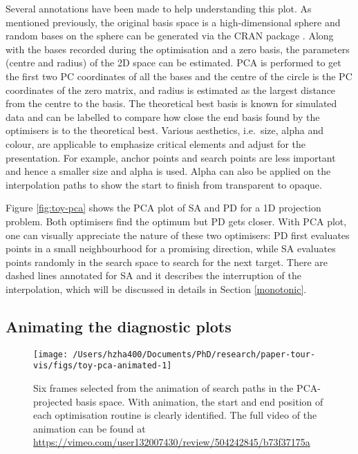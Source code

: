 Several annotations have been made to help understanding this plot. As
mentioned previously, the original basis space is a high-dimensional
sphere and random bases on the sphere can be generated via the CRAN
package  \citep{geozoo}. Along with the bases recorded
during the optimisation and a zero basis, the parameters (centre and
radius) of the 2D space can be estimated. PCA is performed to get the
first two PC coordinates of all the bases and the centre of the circle
is the PC coordinates of the zero matrix, and radius is estimated as the
largest distance from the centre to the basis. The theoretical best
basis is known for simulated data and can be labelled to compare how
close the end basis found by the optimisers is to the theoretical best.
Various aesthetics, i.e.~size, alpha and colour, are applicable to
emphasize critical elements and adjust for the presentation. For
example, anchor points and search points are less important and hence a
smaller size and alpha is used. Alpha can also be applied on the
interpolation paths to show the start to finish from transparent to
opaque.

Figure \ref{fig:toy-pca} shows the PCA plot of SA and PD for a 1D
projection problem. Both optimisers find the optimum but PD gets closer.
With PCA plot, one can visually appreciate the nature of these two
optimisers: PD first evaluates points in a small neighbourhood for a
promising direction, while SA evaluates points randomly in the search
space to search for the next target. There are dashed lines annotated
for SA and it describes the interruption of the interpolation, which
will be discussed in details in Section \ref{monotonic}.

\hypertarget{animating-the-diagnostic-plots}{%
\subsection{Animating the diagnostic
plots}\label{animating-the-diagnostic-plots}}

\begin{Schunk}
\begin{figure}

{\centering \texttt{[image: /Users/hzha400/Documents/PhD/research/paper-tour-vis/figs/toy-pca-animated-1]} 

}

\caption{Six frames selected from the animation of search paths in the PCA-projected basis space. With animation, the start and end position of each optimisation routine is clearly identified. The full video of the animation can be found at \url{https://vimeo.com/user132007430/review/504242845/b73f37175a}}\label{fig:toy-pca-animated}
\end{figure}
\end{Schunk}

